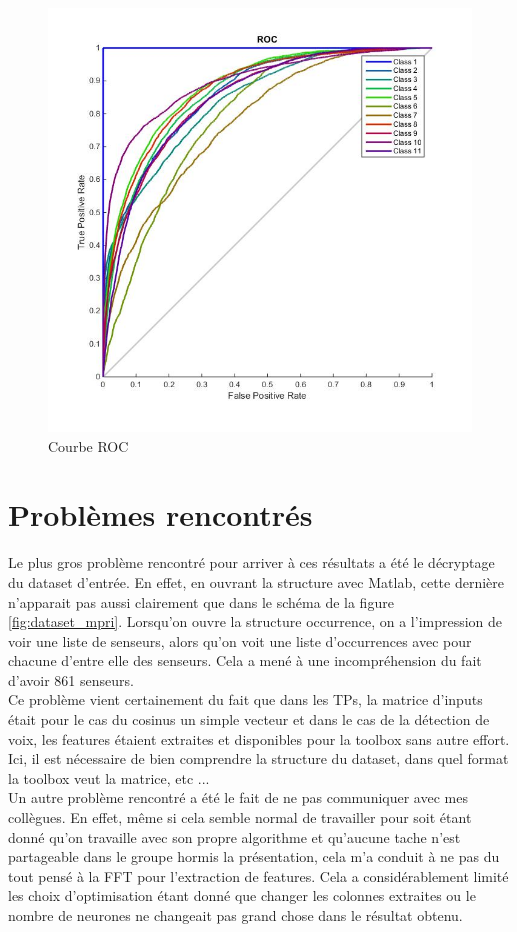 \begin{figure}[h]
  \centering
    \includegraphics[width=0.8\linewidth]{img/ann/results/ROC.jpg}
  \caption{Courbe ROC}
  \label{fig:roc}
\end{figure}

\section*{Problèmes rencontrés}

Le plus gros problème rencontré pour arriver à ces résultats a été le décryptage du dataset d'entrée. En effet, en ouvrant la structure avec Matlab, cette dernière n'apparait pas aussi clairement que dans le schéma de la figure \ref{fig:dataset_mpri}. Lorsqu'on ouvre la structure occurrence, on a l'impression de voir une liste de senseurs, alors qu'on voit une liste d'occurrences avec pour chacune d'entre elle des senseurs. Cela a mené à une incompréhension du fait d'avoir 861 senseurs. \\

Ce problème vient certainement du fait que dans les TPs, la matrice d'inputs était pour le cas du cosinus un simple vecteur et dans le cas de la détection de voix, les features étaient extraites et disponibles pour la toolbox sans autre effort. Ici, il est nécessaire de bien comprendre la structure du dataset, dans quel format la toolbox veut la matrice, etc ... \\

Un autre problème rencontré a été le fait de ne pas communiquer avec mes collègues. En effet, même si cela semble normal de travailler pour soit étant donné qu'on travaille avec son propre algorithme et qu'aucune tache n'est partageable dans le groupe hormis la présentation, cela m'a conduit à ne pas du tout pensé à la FFT pour l'extraction de features. Cela a considérablement limité les choix d'optimisation étant donné que changer les colonnes extraites ou le nombre de neurones ne changeait pas grand chose dans le résultat obtenu. \\

